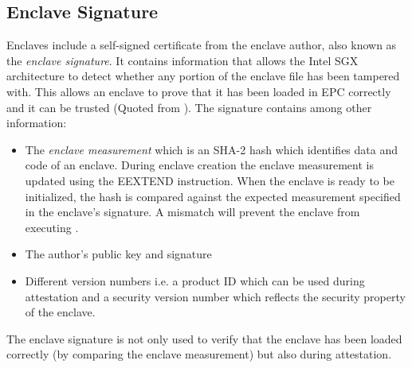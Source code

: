\subsection{Enclave Signature}
\label{sec:EnclaveSignature}
Enclaves include a self-signed certificate from the enclave author, also known as the \textit{enclave signature}. It contains information that allows the Intel SGX architecture 
to detect whether any portion of the enclave file has been tampered with. This allows an enclave to prove that it has been loaded in EPC correctly and it can be trusted (Quoted
from \cite{IntelEnclaveSignature}). The signature contains among other information:
\begin{itemize}
    \item The \textit{enclave measurement} which is an SHA-2 hash \cite{Costan2016IntelSE} which identifies data and code of an enclave. During enclave creation the enclave
          measurement is updated using the EEXTEND instruction. When the enclave is ready to be initialized, the hash is compared against the expected measurement specified
          in the enclave's signature. A mismatch will prevent the enclave from executing \cite{IntelEnclaveSignature}.
    \item The author's public key and signature
    \item Different version numbers i.e. a product ID which can be used during attestation and a security version number which reflects the security property of the enclave.
\end{itemize}
The enclave signature is not only used to verify that the enclave has been loaded correctly (by comparing the enclave measurement) but also during attestation.